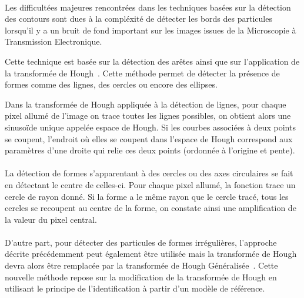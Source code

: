 \paragraph*{}
Les difficultées majeures rencontrées dans les techniques basées sur la détection des contours sont dues à la compléxité de détecter les bords des particules lorsqu'il y a un bruit de fond important sur les images issues de la Microscopie à Transmission Electronique.%

\noindent
Cette technique est basée sur la détection des arêtes ainsi que sur l'application de la transformée de Hough~\cite{PdetectEHT:article}. Cette méthode permet de détecter la présence de formes comme des lignes, des cercles ou encore des ellipses.%

\noindent
Dans la transformée de Hough\cite{HT:url} appliquée à la détection de lignes, pour chaque pixel allumé de l'image on trace toutes les lignes possibles, on obtient alors une sinusoïde unique appelée espace de Hough. Si les courbes associées à deux points se coupent, l'endroit où elles se coupent dans l'espace de Hough correspond aux paramètres d'une droite qui relie ces deux points (ordonnée à l'origine et pente).%

\paragraph*{}
La détection de formes s’apparentant à des cercles ou des axes circulaires se fait en détectant le centre de celles-ci.
Pour chaque pixel allumé, la fonction trace un cercle de rayon donné. Si la forme a le même rayon que le cercle tracé, tous les cercles se recoupent au centre de la forme, on constate ainsi une amplification de la valeur du pixel central.

\paragraph*{}
D'autre part, pour détecter des particules de formes irrégulières, l'approche décrite précédemment peut également \^etre utilisée mais la transformée de Hough devra alors \^etre remplacée par la transformée de Hough Généralisée~\cite{GHT:url}.
Cette nouvelle méthode repose sur la modification de la transformée de Hough en utilisant le principe de l'identification à partir d'un modèle de référence.

